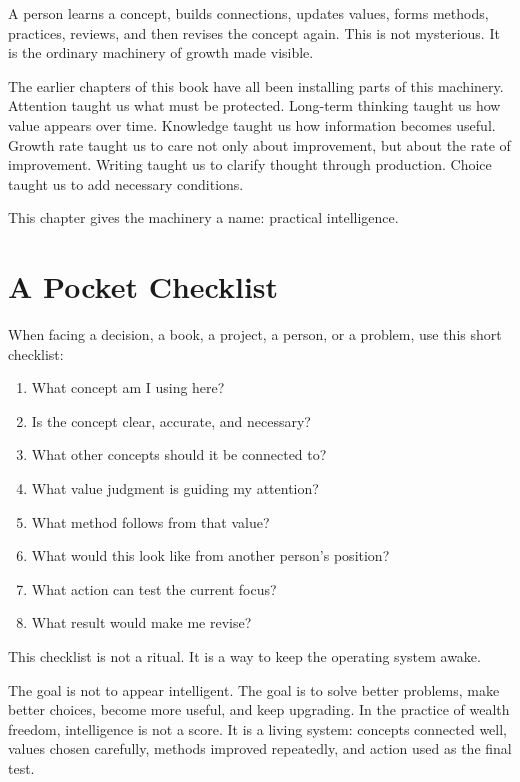 A person learns a concept, builds connections, updates values, forms methods, practices, reviews, and then revises the concept again. This is not mysterious. It is the ordinary machinery of growth made visible.

The earlier chapters of this book have all been installing parts of this machinery. Attention taught us what must be protected. Long-term thinking taught us how value appears over time. Knowledge taught us how information becomes useful. Growth rate taught us to care not only about improvement, but about the rate of improvement. Writing taught us to clarify thought through production. Choice taught us to add necessary conditions.

This chapter gives the machinery a name: practical intelligence.

\section*{A Pocket Checklist}

When facing a decision, a book, a project, a person, or a problem, use this short checklist:

\begin{enumerate}
\item What concept am I using here?
\item Is the concept clear, accurate, and necessary?
\item What other concepts should it be connected to?
\item What value judgment is guiding my attention?
\item What method follows from that value?
\item What would this look like from another person's position?
\item What action can test the current focus?
\item What result would make me revise?
\end{enumerate}

This checklist is not a ritual. It is a way to keep the operating system awake.

The goal is not to appear intelligent. The goal is to solve better problems, make better choices, become more useful, and keep upgrading. In the practice of wealth freedom, intelligence is not a score. It is a living system: concepts connected well, values chosen carefully, methods improved repeatedly, and action used as the final test.
